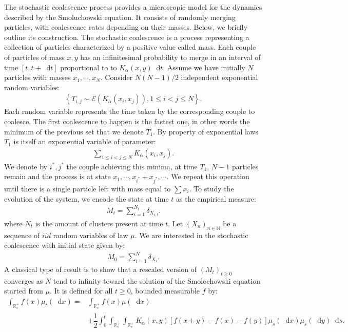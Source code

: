 \documentclass[11pt,a4paper]{article}
\newcommand{\RRP}{\mathbb{R}^+_*}
\newcommand{\Proc}[1]{\left(#1\right)_{t\geq 0}}
\newcommand{\Seq}[1]{\left(#1\right)_{n\in \mathbb{N}}}
\newcommand{\dd}{\mathop{}\!\mathrm{d}}
\begin{document}
The stochastic coalescence process provides a microscopic model for the dynamics described by the Smoluchowski equation. It consists of randomly merging particles, with coalescence rates depending on their masses. Below, we briefly outline its construction. The stochastic coalescence is a process representing a collection of particles characterized by a positive value called mass. Each couple of particles of mass $x,y$ has an infinitesimal probability to merge in an interval of time $[t, t + \dd t]$ proportional to to $K_{\alpha}(x,y)\dd t$. Assume we have initially $N$ particles with masses $x_{1},\cdots,x_{N}$. Consider $N(N-1)/2$ independent exponential random variables:
\begin{align*}
    \left\lbrace T_{i,j} \sim \mathcal{E}\left(K_{\alpha}(x_{i},x_{j})\right), 1 \leq i < j \leq N \right\rbrace.
\end{align*}
Each random variable represents the time taken by the corresponding couple to coalesce. The first coalescence to happen is the fastest one, in other words the minimum of the previous set that we denote $T_1$. By property of exponential laws $T_1$ is itself an exponential variable of parameter:
\begin{align*}
    \sum\limits_{1 \leq i < j \leq N}K_{\alpha}(x_{i},x_{j}).
\end{align*}
We denote by $i^*,j^*$ the couple achieving this minima, at time $T_1$, $N-1$ particles remain and the process is at state $x_{1},\cdots , x_{i^*}+x_{j^*},\cdots$. We repeat this operation until there is a single particle left with mass equal to $\sum\limits x_i$. To study the evolution of the system, we encode the state at time $t$ as the empirical measure:
\begin{align*}
    M_t = \sum\limits_{i = 1}^{N_t} \delta_{X_{i,t}}.
\end{align*}
where $N_t$ is the amount of clusters present at time $t$. Let $\Seq{X_n}$ be a sequence of $iid$ random variables of law $\mu$. We are interested in the stochastic coalescence with initial state given by:
\begin{align*}
    M_0 = \sum\limits_{i = 1}^N \delta_{X_i}.
\end{align*}
A classical type of result is to show that a rescaled version of $\Proc{M_t}$ converges as $N$ tend to infinity toward the solution of the Smolochowski equation started from $\mu$. It is defined for all $t \geq 0$, bounded measurable $f$ by:
\begin{equation}\label{eq:SCE}
    \begin{aligned}
    \int_{\RRP} f(x)\mu_t (\dd x) =& \int_{\RRP} f(x)\mu (\dd x)\\
     &+ \dfrac12\int_0^t \int_{\RRP}\int_{\RRP} 
        K_{\alpha}(x,y)\left[f(x+y) - f(x) - f(y)\right] \mu_s(\dd x)\mu_s(\dd y) \dd s.
    \end{aligned}
\end{equation}
\end{document}
